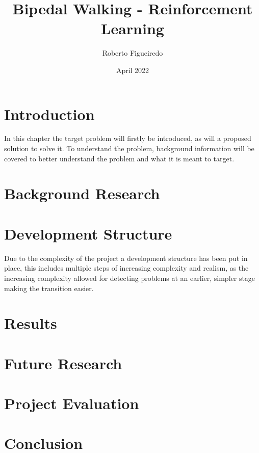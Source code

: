 \documentclass[12pt, a4paper]{report}
\title{Bipedal Walking - Reinforcement Learning}
\author{Roberto Figueiredo}
\date{April 2022}
\begin{document}
\begin{titlepage}
    \maketitle 
    \thispagestyle{empty}
\end{titlepage}





\pagebreak
\tableofcontents
\pagebreak

\chapter{Introduction}
In this chapter the target problem will firstly be introduced, as will a proposed solution to solve it. To understand the problem, 
background information will be covered to better understand the problem and what it is meant to target.



\chapter{Background Research}

    

\chapter{Development Structure}
Due to the complexity of the project a development structure has been put in place, 
this includes multiple steps of increasing complexity and realism, 
as the increasing complexity allowed for detecting problems at an earlier, simpler stage making the transition easier.
    
    

\chapter{Results}
    

\chapter{Future Research}
    

\chapter{Project Evaluation}
    

\chapter{Conclusion}
    


\end{document}
